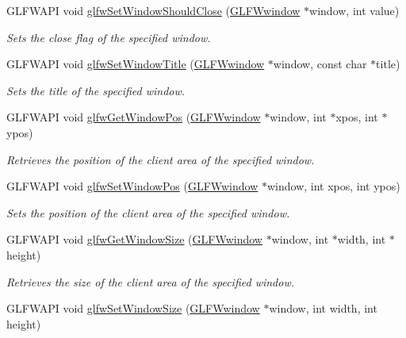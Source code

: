 \begin{DoxyCompactItemize}
G\+L\+F\+W\+A\+P\+I void \hyperlink{group__window_ga1cadeda7a1e2f224e06a8415d30741aa}{glfw\+Set\+Window\+Should\+Close} (\hyperlink{group__window_ga3c96d80d363e67d13a41b5d1821f3242}{G\+L\+F\+Wwindow} $\ast$window, int value)
\begin{DoxyCompactList}\small\item\em Sets the close flag of the specified window. \end{DoxyCompactList}\item 
G\+L\+F\+W\+A\+P\+I void \hyperlink{group__window_ga861ed3414ab8120e2f74151a666ed1dc}{glfw\+Set\+Window\+Title} (\hyperlink{group__window_ga3c96d80d363e67d13a41b5d1821f3242}{G\+L\+F\+Wwindow} $\ast$window, const char $\ast$title)
\begin{DoxyCompactList}\small\item\em Sets the title of the specified window. \end{DoxyCompactList}\item 
G\+L\+F\+W\+A\+P\+I void \hyperlink{group__window_ga0076a8591ef7494d359730cf2250b45b}{glfw\+Get\+Window\+Pos} (\hyperlink{group__window_ga3c96d80d363e67d13a41b5d1821f3242}{G\+L\+F\+Wwindow} $\ast$window, int $\ast$xpos, int $\ast$ypos)
\begin{DoxyCompactList}\small\item\em Retrieves the position of the client area of the specified window. \end{DoxyCompactList}\item 
G\+L\+F\+W\+A\+P\+I void \hyperlink{group__window_ga0dc8d880a0d87be16d3ea8114561f6f0}{glfw\+Set\+Window\+Pos} (\hyperlink{group__window_ga3c96d80d363e67d13a41b5d1821f3242}{G\+L\+F\+Wwindow} $\ast$window, int xpos, int ypos)
\begin{DoxyCompactList}\small\item\em Sets the position of the client area of the specified window. \end{DoxyCompactList}\item 
G\+L\+F\+W\+A\+P\+I void \hyperlink{group__window_ga7feb769ebb3f3d21579b5a3fb07be76e}{glfw\+Get\+Window\+Size} (\hyperlink{group__window_ga3c96d80d363e67d13a41b5d1821f3242}{G\+L\+F\+Wwindow} $\ast$window, int $\ast$width, int $\ast$height)
\begin{DoxyCompactList}\small\item\em Retrieves the size of the client area of the specified window. \end{DoxyCompactList}\item 
G\+L\+F\+W\+A\+P\+I void \hyperlink{group__window_gae54d1f4915ded15e267ddd3f41496cd2}{glfw\+Set\+Window\+Size} (\hyperlink{group__window_ga3c96d80d363e67d13a41b5d1821f3242}{G\+L\+F\+Wwindow} $\ast$window, int width, int height)

\end{DoxyCompactItemize}

